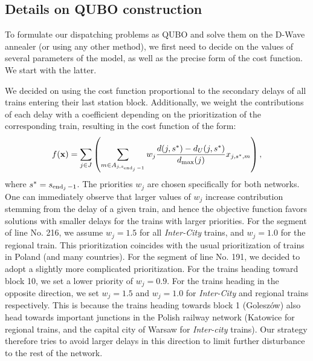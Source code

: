 \subsection{Details on QUBO construction}

To formulate our dispatching problems as QUBO and solve them on the D-Wave
annealer (or using any other method), we first need to decide on the values of
several parameters of the model, as well as the precise form of the cost
function. We start with the latter.

We decided on using the cost function proportional to the secondary delays of
all trains entering their last station block. Additionally, we weight the
contributions of each delay with a coefficient depending on the prioritization
of the corresponding train, resulting in the cost function of the form:
\begin{equation}
  f(\mathbf{x}) = \sum_{j \in J}\left(\sum_{m  \in A_{j,s_{\operatorname*{end}_{j}-1}}}w_{j} \frac{d(j,s^{*}) - d_{U}(j,s^{*})}{d_{\max}(j)}x_{j,s^{*},m}\right),
\end{equation}
where $s^{*} = s_{\operatorname*{end}_{j}-1}$. The priorities $w_{j}$ are chosen specifically for both networks. One can
immediately observe that larger values of $w_{j}$ increase contribution
stemming from the delay of a given train, and hence the objective function
favors solutions with smaller delays for the trains with larger priorities. For
the segment of line No. 216, we assume $w_{j}= 1.5$ for all \emph{Inter-City}
trains, and $w_{j}=1.0$ for the regional train. This prioritization
coincides with the usual prioritization of trains in Poland (and many
countries). For the segment of line No. 191, we decided to adopt a slightly
more complicated prioritization. For the trains heading toward block 10, we set
a lower priority of $w_{j}=0.9$. For the trains heading in the opposite
direction, we set $w_{j}=1.5$ and $w_{j}=1.0$ for \emph{Inter-City} and
regional trains respectively. This is because the trains heading towards block
1 (Goleszów) also head towards important junctions in the Polish railway
network (Katowice for regional trains, and the capital city of Warsaw for
\emph{Inter-city} trains). Our strategy therefore tries to avoid larger delays
in this direction to limit further disturbance to the rest of the network.

